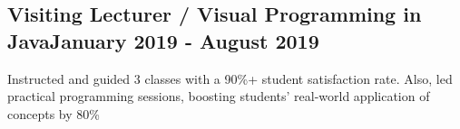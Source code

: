 \subsection{{Visiting Lecturer / Visual Programming in Java\hfill January 2019 - August 2019}}
\begin{zitemize}

\item Instructed and guided 3 classes with a 90\%+ student satisfaction rate. Also, led practical programming sessions, boosting students' real-world application of concepts by 80\%
    
\end{zitemize}
